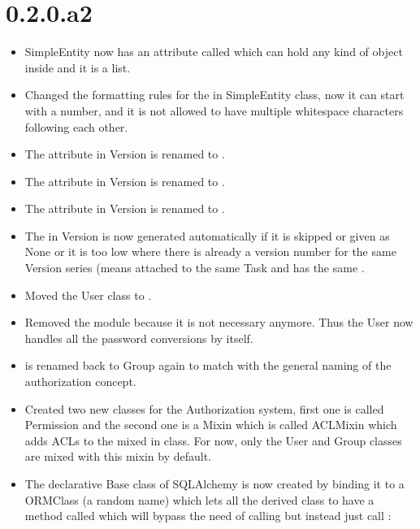 \documentclass[a4paper,10pt,english]{sphinxmanual}
\begin{document}
\section{0.2.0.a2}
\label{changelog:a2}\begin{itemize}
\item {} 
SimpleEntity now has an attribute called  which can hold any
kind of  object inside and it is a list.

\item {} 
Changed the formatting rules for the  in SimpleEntity class, now it
can start with a number, and it is not allowed to have multiple whitespace
characters following each other.

\item {} 
The  attribute in Version is renamed to .

\item {} 
The  attribute in Version is renamed to .

\item {} 
The  attribute in Version is renamed to .

\item {} 
The  in Version is now generated automatically if it is
skipped or given as None or it is too low where there is already a version
number for the same Version series (means attached to the same Task and has
the same .

\item {} 
Moved the User class to .

\item {} 
Removed the  module because it is not necessary anymore.
Thus the User now handles all the password conversions by itself.

\item {} 
 is renamed back to Group
again to match with the general naming of the authorization concept.

\item {} 
Created two new classes for the Authorization system, first one is called
Permission and the second one is a Mixin which is called ACLMixin which adds
ACLs to the mixed in class. For now, only the User and Group classes are
mixed with this mixin by default.

\item {} 
The declarative Base class of SQLAlchemy is now created by binding it to a
ORMClass (a random name) which lets all the derived class to have a method
called  which will bypass the need of calling
 but instead just call :


\end{itemize}
\end{document}
